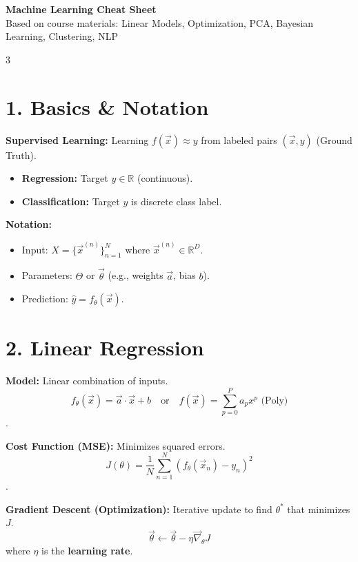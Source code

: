 \documentclass[10pt, a4paper, landscape]{article}
\begin{document}
\begin{center}
    {\Large \bfseries Machine Learning Cheat Sheet} \\
    \footnotesize Based on course materials: Linear Models, Optimization, PCA, Bayesian Learning, Clustering, NLP
\end{center}

\begin{multicols*}{3}

\section{1. Basics \& Notation}
\textbf{Supervised Learning:} Learning $f(\vec{x}) \approx y$ from labeled pairs $(\vec{x}, y)$ (Ground Truth).
\begin{itemize}
    \item \textbf{Regression:} Target $y \in \mathbb{R}$ (continuous).
    \item \textbf{Classification:} Target $y$ is discrete class label.
\end{itemize}
\textbf{Notation:}
\begin{itemize}
    \item Input: $X = \{\vec{x}^{(n)}\}_{n=1}^N$ where $\vec{x}^{(n)} \in \mathbb{R}^D$.
    \item Parameters: $\Theta$ or $\vec{\theta}$ (e.g., weights $\vec{a}$, bias $b$).
    \item Prediction: $\hat{y} = f_\theta(\vec{x})$.
\end{itemize}

\section{2. Linear Regression}
\textbf{Model:} Linear combination of inputs.
$$ f_\theta(\vec{x}) = \vec{a} \cdot \vec{x} + b \quad \text{or} \quad f(\vec{x}) = \sum_{p=0}^P a_p x^p \text{ (Poly)} $$
.

\textbf{Cost Function (MSE):} Minimizes squared errors.
$$ J(\theta) = \frac{1}{N} \sum_{n=1}^{N} (f_\theta(\vec{x}_n) - y_n)^2 $$
.

\textbf{Gradient Descent (Optimization):}
Iterative update to find $\theta^*$ that minimizes $J$.
$$ \vec{\theta} \leftarrow \vec{\theta} - \eta \vec{\nabla}_{\theta} J $$
where $\eta$ is the \textbf{learning rate}.


\end{multicols*}
\end{document}
